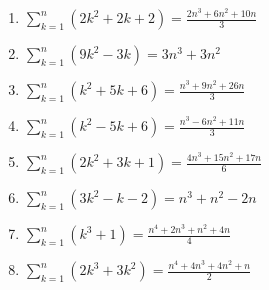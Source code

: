 \documentclass[11pt,a4paper]{article}
\begin{document}
\begin{enumerate}
\item $\displaystyle \sum_{k=1}^{n} \left(2k^{2} + 2k + 2\right) = \frac{2n^{3} + 6n^{2} + 10n}{3}$
\item $\displaystyle \sum_{k=1}^{n} \left(9k^{2} - 3k\right) = 3n^{3} + 3n^{2}$
\item $\displaystyle \sum_{k=1}^{n} \left(k^{2} + 5k + 6\right) = \frac{n^{3} + 9n^{2} + 26n}{3}$
\item $\displaystyle \sum_{k=1}^{n} \left(k^{2} - 5k + 6\right) = \frac{n^{3} - 6n^{2} + 11n}{3}$
\item $\displaystyle \sum_{k=1}^{n} \left(2k^{2} + 3k + 1\right) = \frac{4n^{3} + 15n^{2} + 17n}{6}$
\item $\displaystyle \sum_{k=1}^{n} \left(3k^{2} - k - 2\right) = n^{3} + n^{2} - 2n$
\item $\displaystyle \sum_{k=1}^{n} \left(k^{3} + 1\right) = \frac{n^{4} + 2n^{3} + n^{2} + 4n}{4}$
\item $\displaystyle \sum_{k=1}^{n} \left(2k^{3} + 3k^{2}\right) = \frac{n^{4} + 4n^{3} + 4n^{2} + n}{2}$
\end{enumerate}
\end{document}
